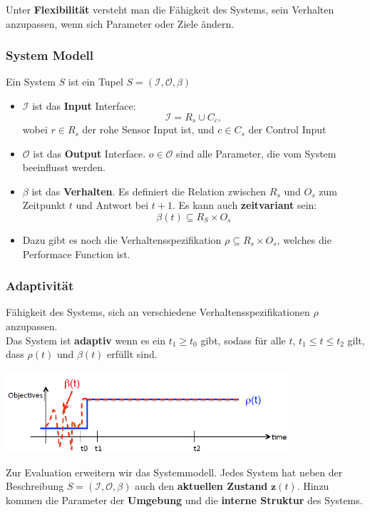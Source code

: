 \documentclass[a4paper]{article}
\begin{document}
Unter \textbf{Flexibilität} versteht man die Fähigkeit des Systems, sein Verhalten anzupassen, wenn sich Parameter oder Ziele ändern. 

\subsubsection{System Modell}
Ein System $S$ ist ein Tupel $S = (\mathcal{I},\mathcal{O},\beta)$
\begin{itemize}
	\item $\mathcal{I}$ ist das \textbf{Input} Interface: $$\mathcal{I} = R_s \cup C_c,$$ wobei $r \in R_s$ der rohe Sensor Input ist, und $c\in C_s$ der Control Input
	\item $\mathcal{O}$ ist das \textbf{Output} Interface. $o \in \mathcal{O}$ sind alle Parameter, die vom System beeinflusst werden.
	\item $\beta$ ist das \textbf{Verhalten}. Es definiert die Relation zwischen $R_s$ und $O_s$ zum Zeitpunkt $t$ und Antwort bei $t+1$. Es kann auch \textbf{zeitvariant} sein:
	$$\beta(t)\subseteq R_S \times O_s$$
	\item Dazu gibt es noch die Verhaltensspezifikation $\rho \subseteq R_s \times O_s$, welches die Performace Function ist. 
\end{itemize}
\subsubsection{Adaptivität}
Fähigkeit des Systems, sich an verschiedene Verhaltensspezifikationen $\rho$ anzupassen.\\
Das System ist \textbf{adaptiv} wenn es ein $t_1 \geq t_0$ gibt, sodass für alle $t$, $t_1\leq t \leq t_2$ gilt, dass $\rho(t)$ und $\beta(t)$ erfüllt sind.
\begin{center}
	\includegraphics[height = 3cm]{rho.png}
\end{center}

Zur Evaluation erweitern wir das Systemmodell. Jedes System hat neben der Beschreibung $S=(\mathcal{I},\mathcal{O},\beta)$ auch den \textbf{aktuellen Zustand} $\mathbf{z}(t)$. Hinzu kommen die Parameter der \textbf{Umgebung} und die \textbf{interne Struktur} des Systems.\\
\end{document}
